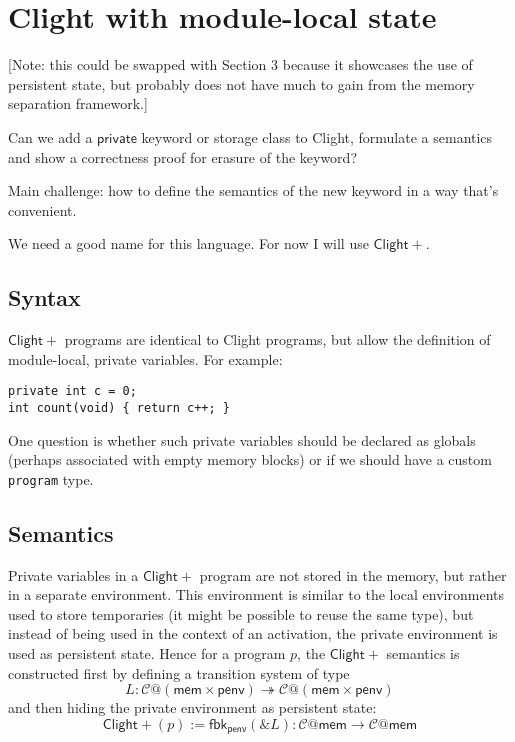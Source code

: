 \documentclass[acmsmall,screen,review,anonymous]{acmart}
\newcommand{\ClightP}{\ensuremath{\mathsf{Clight+}}}
\begin{document}

\section{Clight with module-local state} %

[Note: this could be swapped with Section 3
because it showcases the use of persistent state,
but probably does not have much to gain
from the memory separation framework.]

Can we add a $\mathsf{private}$ keyword or storage class to Clight,
formulate a semantics and show a correctness proof
for erasure of the keyword?

Main challenge: how to define the semantics of the new keyword
in a way that's convenient.

We need a good name for this language.
For now I will use \ClightP{}.

\subsection{Syntax}

\ClightP{} programs are identical to Clight programs,
but allow the definition of module-local, private variables.
For example:

\begin{verbatim}
private int c = 0;
int count(void) { return c++; }
\end{verbatim}

One question is whether such private variables
should be declared as globals
(perhaps associated with empty memory blocks)
or if we should have a custom \texttt{program} type.

\subsection{Semantics}

Private variables in a \ClightP{} program
are not stored in the memory,
but rather in a separate environment.
This environment is similar to
the local environments used to store temporaries
(it might be possible to reuse the same type),
but instead of being used in the context of an activation,
the private environment is used as persistent state.
Hence for a program $p$, the \ClightP{} semantics is constructed
first by defining a transition system of type
\[
  L : \mathcal{C}@(\mathsf{mem}\times\mathsf{penv}) \twoheadrightarrow
      \mathcal{C}@(\mathsf{mem}\times\mathsf{penv})
\]
and then hiding the private environment as persistent state:
\[
  \ClightP{}(p) := \mathsf{fbk}_\mathsf{penv}(\&L) :
    \mathcal{C}@\mathsf{mem} \rightarrow
    \mathcal{C}@\mathsf{mem}
\]
\end{document}
